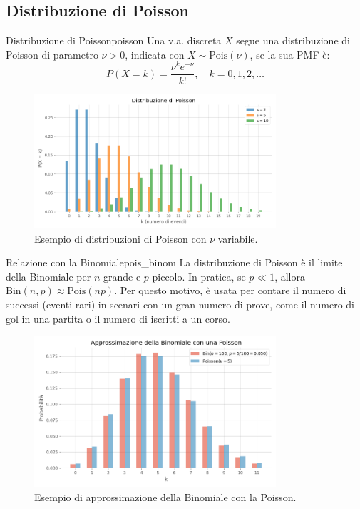\subsection{Distribuzione di Poisson}

\begin{definizione}{Distribuzione di Poisson}{poisson}
Una v.a. discreta \(X\) segue una distribuzione di Poisson di parametro \(\nu > 0\), indicata con \(X \sim \text{Pois}(\nu)\), se la sua PMF è:
\[
P(X=k) = \frac{\nu^k e^{-\nu}}{k!}, \quad k=0, 1, 2, \dots \text{}
\]
\end{definizione}

\begin{figure}[H]
    \centering
    \includegraphics[width=0.8\textwidth]{images/th_01_03/poisson.png}
    \caption{Esempio di distribuzioni di Poisson con \(\nu\) variabile.}
    \label{fig:poisson}
\end{figure}

\begin{nota}{Relazione con la Binomiale}{pois_binom}
La distribuzione di Poisson è il limite della Binomiale per \(n\) grande e \(p\) piccolo. In pratica, se \(p \ll 1\), allora \(\text{Bin}(n,p) \approx \text{Pois}(np)\). Per questo motivo, è usata per contare il numero di successi (eventi rari) in scenari con un gran numero di prove, come il numero di gol in una partita o il numero di iscritti a un corso.

\begin{figure}[H]
    \centering
    \includegraphics[width=0.8\textwidth]{images/th_01_03/binomiale_vs_poisson.png}
    \caption{Esempio di approssimazione della Binomiale con la Poisson.}
    \label{fig:binomiale_vs_poisson}
\end{figure}

\end{nota}

